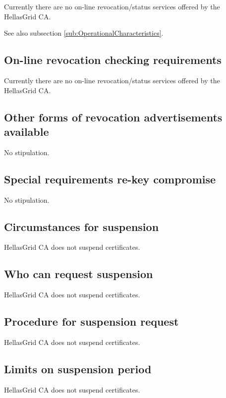 Currently there are no on-line revocation/status services offered by the HellasGrid CA.

See also subsection \ref{sub:OperationalCharacteristics}.

\subsection{On-line revocation checking requirements}

Currently there are no on-line revocation/status services offered by the HellasGrid CA.

\subsection{Other forms of revocation advertisements available}

No stipulation.

\subsection{Special requirements re-key compromise}

No stipulation.

\subsection{Circumstances for suspension}
\label{sub:CircumstancesForSuspension}

HellasGrid CA does not suspend certificates.

\subsection{Who can request suspension}

HellasGrid CA does not suspend certificates.

\subsection{Procedure for suspension request}

HellasGrid CA does not suspend certificates.

\subsection{Limits on suspension period}

HellasGrid CA does not suspend certificates.

